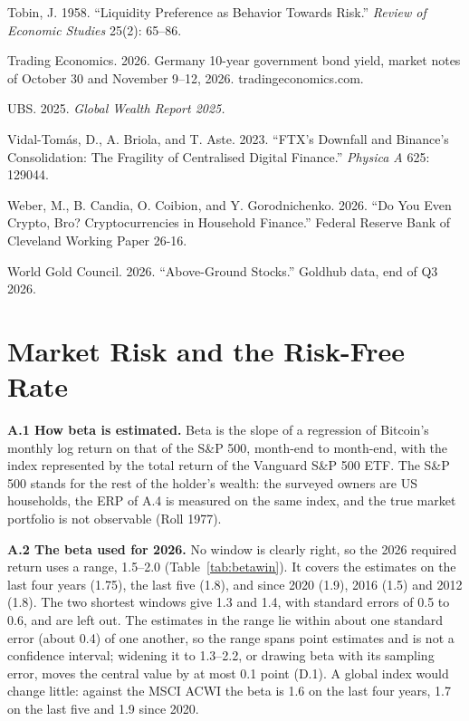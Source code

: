 \documentclass[11pt]{article}
\begin{document}
\begin{list}{}{\setlength{\itemindent}{-1.5em}\setlength{\leftmargin}{1.5em}\setlength{\itemsep}{2pt}\setlength{\parsep}{0pt}}
\item Tobin, J. 1958. ``Liquidity Preference as Behavior Towards Risk.'' \emph{Review of Economic Studies} 25(2): 65--86.
\item Trading Economics. 2026. Germany 10-year government bond yield, market notes of October 30 and November 9--12, 2026. tradingeconomics.com.
\item UBS. 2025. \emph{Global Wealth Report 2025.}
\item Vidal-Tom\'as, D., A. Briola, and T. Aste. 2023. ``FTX's Downfall and Binance's Consolidation: The Fragility of Centralised Digital Finance.'' \emph{Physica A} 625: 129044.
\item Weber, M., B. Candia, O. Coibion, and Y. Gorodnichenko. 2026. ``Do You Even Crypto, Bro? Cryptocurrencies in Household Finance.'' Federal Reserve Bank of Cleveland Working Paper 26-16.
\item World Gold Council. 2026. ``Above-Ground Stocks.'' Goldhub data, end of Q3 2026.
\end{list}

\vspace{1em}
\appendix

\section{Market Risk and the Risk-Free Rate}

\textbf{A.1 How beta is estimated.} Beta is the slope of a regression of Bitcoin's monthly log return on that of the S\&P 500, month-end to month-end, with the index represented by the total return of the Vanguard S\&P 500 ETF. The S\&P 500 stands for the rest of the holder's wealth: the surveyed owners are US households, the ERP of A.4 is measured on the same index, and the true market portfolio is not observable (Roll 1977).

\textbf{A.2 The beta used for 2026.} No window is clearly right, so the 2026 required return uses a range, 1.5--2.0 (Table~\ref{tab:betawin}). It covers the estimates on the last four years (1.75), the last five (1.8), and since 2020 (1.9), 2016 (1.5) and 2012 (1.8). The two shortest windows give 1.3 and 1.4, with standard errors of 0.5 to 0.6, and are left out. The estimates in the range lie within about one standard error (about 0.4) of one another, so the range spans point estimates and is not a confidence interval; widening it to 1.3--2.2, or drawing beta with its sampling error, moves the central value by at most 0.1 point (D.1). A global index would change little: against the MSCI ACWI the beta is 1.6 on the last four years, 1.7 on the last five and 1.9 since 2020.
\end{document}
